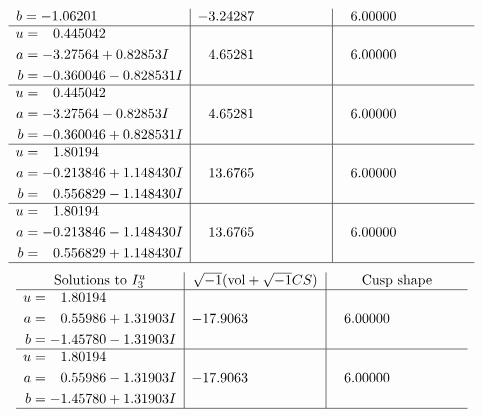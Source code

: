 \documentclass[1p]{elsarticle_modified}
\theoremstyle{definition}
\newcommand{\I}{\sqrt{-1}}
\begin{document}
$$\begin{array}{c|c|c}
\begin{aligned}
b &= -1.06201\phantom{ +0.000000I}\end{aligned}
 & -3.24287\phantom{ +0.000000I} & \phantom{-}6.00000\phantom{ +0.000000I} \\ \hline\begin{aligned}
u &= \phantom{-}0.445042\phantom{ +0.000000I} \\
a &= -3.27564 + 0.82853 I \\
b &= -0.360046 - 0.828531 I\end{aligned}
 & \phantom{-}4.65281\phantom{ +0.000000I} & \phantom{-}6.00000\phantom{ +0.000000I} \\ \hline\begin{aligned}
u &= \phantom{-}0.445042\phantom{ +0.000000I} \\
a &= -3.27564 - 0.82853 I \\
b &= -0.360046 + 0.828531 I\end{aligned}
 & \phantom{-}4.65281\phantom{ +0.000000I} & \phantom{-}6.00000\phantom{ +0.000000I} \\ \hline\begin{aligned}
u &= \phantom{-}1.80194\phantom{ +0.000000I} \\
a &= -0.213846 + 1.148430 I \\
b &= \phantom{-}0.556829 - 1.148430 I\end{aligned}
 & \phantom{-}13.6765\phantom{ +0.000000I} & \phantom{-}6.00000\phantom{ +0.000000I} \\ \hline\begin{aligned}
u &= \phantom{-}1.80194\phantom{ +0.000000I} \\
a &= -0.213846 - 1.148430 I \\
b &= \phantom{-}0.556829 + 1.148430 I\end{aligned}
 & \phantom{-}13.6765\phantom{ +0.000000I} & \phantom{-}6.00000\phantom{ +0.000000I}\\
 \hline 
 \end{array}$$\newpage$$\begin{array}{c|c|c}  
\text{Solutions to }I^u_{3}& \I (\text{vol} + \sqrt{-1}CS) & \text{Cusp shape}\\
 \hline 
\begin{aligned}
u &= \phantom{-}1.80194\phantom{ +0.000000I} \\
a &= \phantom{-}0.55986 + 1.31903 I \\
b &= -1.45780 - 1.31903 I\end{aligned}
 & -17.9063\phantom{ +0.000000I} & \phantom{-}6.00000\phantom{ +0.000000I} \\ \hline\begin{aligned}
u &= \phantom{-}1.80194\phantom{ +0.000000I} \\
a &= \phantom{-}0.55986 - 1.31903 I \\
b &= -1.45780 + 1.31903 I\end{aligned}
 & -17.9063\phantom{ +0.000000I} & \phantom{-}6.00000\phantom{ +0.000000I}\\
 \hline 
 \end{array}$$\newpage
\end{document}
